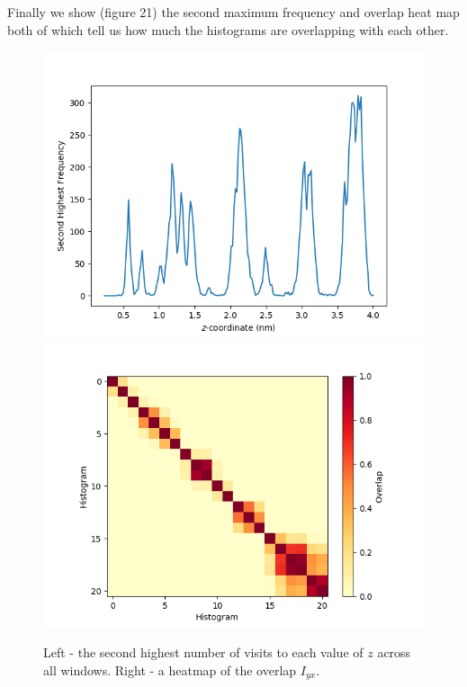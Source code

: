 \documentclass[12pt, onecolumn]{revtex4}    %
\begin{document}
Finally we show (figure 21) the second maximum frequency and overlap heat map both of which tell us how much the histograms are overlapping with each other.\\   

\begin{figure}[h!]
\includegraphics[scale=0.4]{HairUMBScnd}
\includegraphics[scale=0.4]{HairUmbOverOrd}
\label{fig: hairover}
\caption{Left - the second highest number of visits to each value of $z$ across all windows.  Right - a heatmap of the overlap $I_{yx}$.}
\end{figure}
\end{document}
